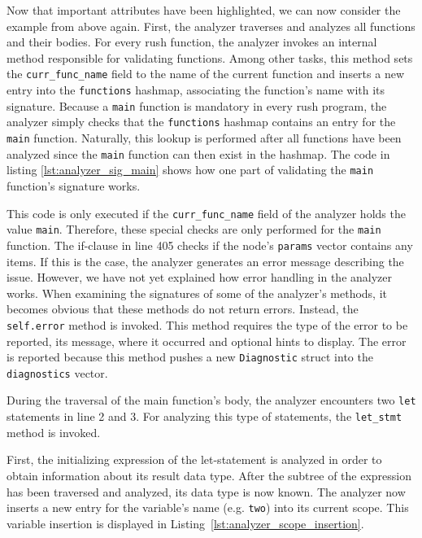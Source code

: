 Now that important attributes have been highlighted, we can now consider the example from above again.
First, the analyzer traverses and analyzes all functions and their bodies.
For every rush function, the analyzer invokes an internal method responsible for validating functions.
Among other tasks, this method sets the \texttt{curr\_func\_name} field to the name of the current function and
inserts a new entry into the \texttt{functions} hashmap, associating the function's name with its signature.
Because a \texttt{main} function is mandatory in every rush program,
the analyzer simply checks that the \texttt{functions} hashmap contains an entry for the \texttt{main} function.
Naturally, this lookup is performed after all functions have been analyzed since the \texttt{main} function can then exist in the hashmap.
The code in listing \ref{lst:analyzer_sig_main} shows how one part of validating the \texttt{main} function's signature works.


This code is only executed if the \texttt{curr\_func\_name} field of the analyzer holds the value \texttt{main}.
Therefore, these special checks are only performed for the \texttt{main} function.
The if-clause in line 405 checks if the node's \texttt{params} vector contains any items.
If this is the case, the analyzer generates an error message describing the issue.
However, we have not yet explained how error handling in the analyzer works.
When examining the signatures of some of the analyzer's methods, it becomes obvious that these methods do not return errors.
Instead, the \texttt{self.error} method is invoked.
This method requires the type of the error to be reported, its message, where it occurred and optional hints to display.
The error is reported because this method pushes a new \texttt{Diagnostic} struct into the \texttt{diagnostics} vector.

During the traversal of the main function's body, the analyzer encounters two \texttt{let} statements in line 2 and 3.
For analyzing this type of statements, the \texttt{let\_stmt} method is invoked.


First, the initializing expression of the let-statement is analyzed in order to obtain information about its result data type.
After the subtree of the expression has been traversed and analyzed, its data type is now known.
The analyzer now inserts a new entry for the variable's name (e.g. \texttt{two}) into its current scope.
This variable insertion is displayed in Listing~\ref{lst:analyzer_scope_insertion}.

